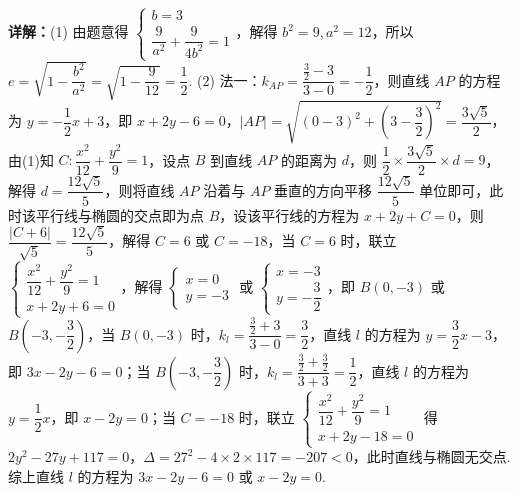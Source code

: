 \begin{question}[points=15]
\begin{solution}
\textbf{详解：}(1) 由题意得 $\begin{cases} b=3 \\ \dfrac{9}{a^2}+\dfrac{9}{4b^2}=1 \end{cases}$，解得 $b^2=9, a^2=12$，所以 $e=\sqrt{1-\dfrac{b^2}{a^2}}=\sqrt{1-\dfrac{9}{12}}=\dfrac{1}{2}$.
(2) 法一：$k_{AP}=\dfrac{\frac{3}{2}-3}{3-0}=-\dfrac{1}{2}$，则直线 $AP$ 的方程为 $y=-\dfrac{1}{2}x+3$，即 $x+2y-6=0$，$|AP|=\sqrt{(0-3)^2+\left(3-\dfrac{3}{2}\right)^2}=\dfrac{3\sqrt{5}}{2}$，由(1)知 $C:\dfrac{x^2}{12}+\dfrac{y^2}{9}=1$，设点 $B$ 到直线 $AP$ 的距离为 $d$，则 $\dfrac{1}{2}\times\dfrac{3\sqrt{5}}{2}\times d=9$，解得 $d=\dfrac{12\sqrt{5}}{5}$，则将直线 $AP$ 沿着与 $AP$ 垂直的方向平移 $\dfrac{12\sqrt{5}}{5}$ 单位即可，此时该平行线与椭圆的交点即为点 $B$，设该平行线的方程为 $x+2y+C=0$，则 $\dfrac{|C+6|}{\sqrt{5}}=\dfrac{12\sqrt{5}}{5}$，解得 $C=6$ 或 $C=-18$，当 $C=6$ 时，联立 $\begin{cases} \dfrac{x^2}{12}+\dfrac{y^2}{9}=1 \\ x+2y+6=0 \end{cases}$，解得 $\begin{cases} x=0 \\ y=-3 \end{cases}$ 或 $\begin{cases} x=-3 \\ y=-\dfrac{3}{2} \end{cases}$，即 $B(0,-3)$ 或 $B\left(-3,-\dfrac{3}{2}\right)$，当 $B(0,-3)$ 时，$k_l=\dfrac{\frac{3}{2}+3}{3-0}=\dfrac{3}{2}$，直线 $l$ 的方程为 $y=\dfrac{3}{2}x-3$，即 $3x-2y-6=0$；当 $B\left(-3,-\dfrac{3}{2}\right)$ 时，$k_l=\dfrac{\frac{3}{2}+\frac{3}{2}}{3+3}=\dfrac{1}{2}$，直线 $l$ 的方程为 $y=\dfrac{1}{2}x$，即 $x-2y=0$；当 $C=-18$ 时，联立 $\begin{cases} \dfrac{x^2}{12}+\dfrac{y^2}{9}=1 \\ x+2y-18=0 \end{cases}$ 得 $2y^2-27y+117=0$，$\Delta=27^2-4\times2\times117=-207<0$，此时直线与椭圆无交点. 综上直线 $l$ 的方程为 $3x-2y-6=0$ 或 $x-2y=0$.
\end{solution}
\end{question}

